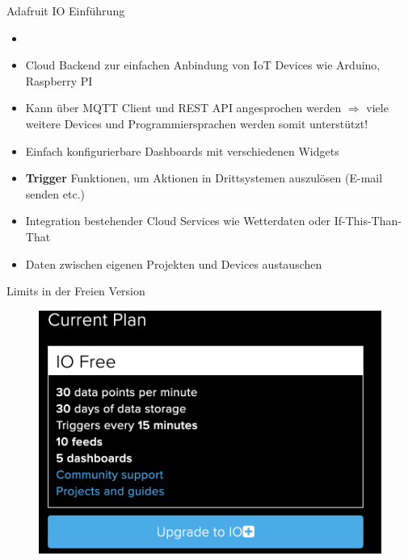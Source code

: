 \begin{frame}{Adafruit IO Einführung}
 \begin{itemize}
        \setlength{\itemindent}{1.4in}
        \item [\textbf{Adafruit IO Einführung}]
    \end{itemize}
    \begin{itemize}
        \item Cloud Backend zur einfachen Anbindung von IoT Devices wie Arduino, Raspberry PI
        \item Kann über MQTT Client und REST  API angesprochen werden  $\Rightarrow$ viele weitere Devices und Programmiersprachen werden somit unterstützt!
        \item Einfach konfigurierbare Dashboards mit verschiedenen Widgets
        \item \textbf{Trigger} Funktionen, um Aktionen in Drittsystemen auszulösen (E-mail senden etc.)
        \item Integration bestehender Cloud Services wie Wetterdaten oder If-This-Than-That
        \item Daten zwischen eigenen Projekten und Devices austauschen
    \end{itemize}    
\end{frame}


\begin{frame}{Limits in der Freien Version}
  \begin{figure}[!htb]
  \hspace*{5mm}
        \includegraphics[scale=0.6]{7-datenaustausch/img/adafruit-limits} 
    \end{figure}
\end{frame}

